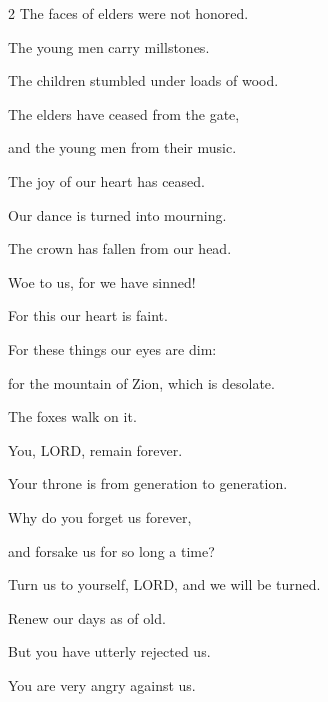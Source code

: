 \begin{multicols}{2}
	The faces of elders were not honored.
	
	
	\myverse{}The young men carry millstones.
	
	The children stumbled under loads of wood.
	
	
	\myverse{}The elders have ceased from the gate,
	
	and the young men from their music.
	
	
	\myverse{}The joy of our heart has ceased.
	
	Our dance is turned into mourning.
	
	
	\myverse{}The crown has fallen from our head.
	
	Woe to us, for we have sinned!
	
	
	\myverse{}For this our heart is faint.
	
	For these things our eyes are dim:
	
	
	\myverse{}for the mountain of Zion, which is desolate.
	
	The foxes walk on it.
	
	\vspace{\baselineskip}
	
	\myverse{}You, LORD, remain forever.
	
	Your throne is from generation to generation.
	
	
	\myverse{}Why do you forget us forever,
	
	and forsake us for so long a time?
	
	\myverse{}Turn us to yourself, LORD, and we will be turned.
	
	Renew our days as of old.
		
	\myverse{}But you have utterly rejected us.
	
	You are very angry against us.
\end{multicols}

